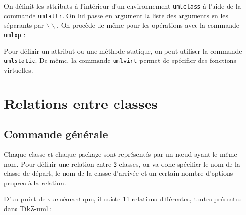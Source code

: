 \documentclass[a4paper,11pt]{report}
\newcommand{\inputTikZ}[1]{%
  }%
\newcommand{\inputTikZ}[1]{%
    \texttt{[image: fig/\#1.pdf]}%
  }%
\newcommand{\tuml}{{\sc TikZ-uml}}
\begin{document}
On définit les attributs à l'intérieur d'un environnement {\tt umlclass} à l'aide de la commande {\tt umlattr}. On lui passe en argument la liste des arguments en les séparants par $\backslash\backslash$. On procède de même pour les opérations avec la commande {\tt umlop} :

\medskip

\begin{minipage}{0.5\textwidth}

\end{minipage}
\begin{minipage}{0.4\textwidth}
\begin{center}
\inputTikZ{figure7}
\end{center}
\end{minipage}

\medskip

Pour définir un attribut ou une méthode statique, on peut utiliser la commande {\tt umlstatic}. De même, la commande {\tt umlvirt} permet de spécifier des fonctions virtuelles.

\section{Relations entre classes}\label{s.rel}

\subsection{Commande générale}\label{ss.relgen}

Chaque classe et chaque package sont représentés par un n\oe{}ud ayant le même nom. Pour définir une relation entre 2 classes, on va donc spécifier le nom de la classe de départ, le nom de la classe d'arrivée et un certain nombre d'options propres à la relation.

\medskip

\begin{minipage}{0.5\textwidth}

\end{minipage}
\begin{minipage}{0.4\textwidth}
\begin{center}
\inputTikZ{figure8}
\end{center}
\end{minipage}

D'un point de vue sémantique, il existe 11 relations différentes, toutes présentes dans \tuml{} :
\end{document}
